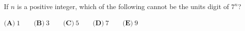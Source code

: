 If $n$ is a positive integer, which of the following cannot be the units digit of $7^n$?

$\textbf{(A)}\ 1\qquad\textbf{(B)}\ 3\qquad\textbf{(C)}\ 5\qquad\textbf{(D)}\ 7\qquad\textbf{(E)}\ 9$
